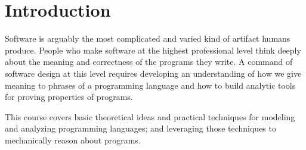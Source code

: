 \section{Introduction}

Software is arguably the most complicated and varied kind of artifact
humans produce.
%
People who make software at the highest professional level think
deeply about the meaning and correctness of the programs they write.
%
A command of software design at this level requires developing an
understanding of how we give meaning to phrases of a programming language
and how to build analytic tools for proving properties of programs.

This course covers basic theoretical ideas and practical techniques
for modeling and analyzing programming languages; and leveraging those
techniques to mechanically reason about programs.




